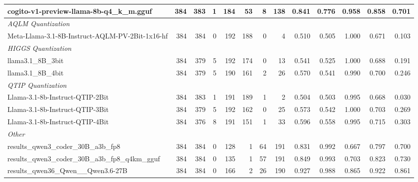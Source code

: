 \begin{table}[htbp]
{\begin{tabular}{lrrrrrrrrrrrr}
    cogito-v1-preview-llama-8b-q4\_k\_m.gguf & 384 & 383 & 1 & 184 & 53 & 8 & 138 & 0.841 & 0.776 & 0.958 & 0.858 & 0.701 \\
    \midrule
    \multicolumn{13}{l}{\textit{AQLM Quantization}} \\
    \midrule
    Meta-Llama-3.1-8B-Instruct-AQLM-PV-2Bit-1x16-hf & 384 & 384 & 0 & 192 & 188 & 0 & 4 & 0.510 & 0.505 & 1.000 & 0.671 & 0.103 \\
    \midrule
    \multicolumn{13}{l}{\textit{HIGGS Quantization}} \\
    \midrule
    llama3.1\_8B\_3bit & 384 & 379 & 5 & 192 & 174 & 0 & 13 & 0.541 & 0.525 & 1.000 & 0.688 & 0.191 \\
    llama3.1\_8B\_4bit & 384 & 379 & 5 & 190 & 161 & 2 & 26 & 0.570 & 0.541 & 0.990 & 0.700 & 0.246 \\
    \midrule
    \multicolumn{13}{l}{\textit{QTIP Quantization}} \\
    \midrule
    Llama-3.1-8b-Instruct-QTIP-2Bit & 384 & 383 & 1 & 191 & 189 & 1 & 2 & 0.504 & 0.503 & 0.995 & 0.668 & 0.030 \\
    Llama-3.1-8b-Instruct-QTIP-3Bit & 384 & 379 & 5 & 192 & 162 & 0 & 25 & 0.573 & 0.542 & 1.000 & 0.703 & 0.269 \\
    Llama-3.1-8b-Instruct-QTIP-4Bit & 384 & 376 & 8 & 191 & 151 & 1 & 33 & 0.596 & 0.558 & 0.995 & 0.715 & 0.303 \\
    \midrule
    \multicolumn{13}{l}{\textit{Other}} \\
    \midrule
    results\_qwen3\_coder\_30B\_a3b\_fp8 & 384 & 384 & 0 & 128 & 1 & 64 & 191 & 0.831 & 0.992 & 0.667 & 0.797 & 0.700 \\
    results\_qwen3\_coder\_30B\_a3b\_fp8\_q4km\_gguf & 384 & 384 & 0 & 135 & 1 & 57 & 191 & 0.849 & 0.993 & 0.703 & 0.823 & 0.730 \\
    results\_qwen36\_Qwen\_\_Qwen3.6-27B & 384 & 384 & 0 & 166 & 2 & 26 & 190 & 0.927 & 0.988 & 0.865 & 0.922 & 0.861 \\
    \bottomrule
  \end{tabular}
  }
\end{table}

